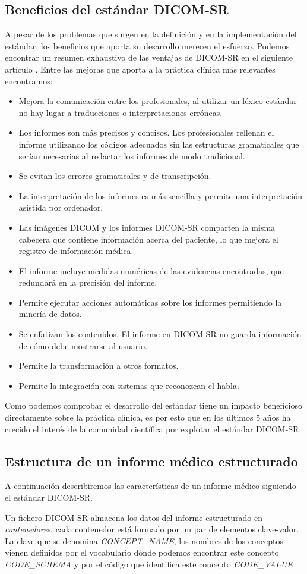 \subsection{Beneficios del estándar DICOM-SR}
A pesar de los problemas que surgen en la definición y en la implementación del estándar, los beneficios que aporta su desarrollo merecen el esfuerzo. Podemos encontrar un resumen exhaustivo de las ventajas de DICOM-SR en el siguiente artículo \cite{noumeir2006benefits}. Entre las mejoras que aporta a la práctica clínica más relevantes encontramos: 
\begin{itemize}
	\item Mejora la comunicación entre los profesionales, al utilizar un léxico estándar no hay lugar a traducciones o 	interpretaciones erróneas. 
	\item Los informes son más precisos y concisos. Los profesionales rellenan el informe utilizando los códigos adecuados sin 	las estructuras gramaticales que serían necesarias al redactar los informes de modo tradicional. 
	\item Se evitan los errores gramaticales y de transcripción.
	\item La interpretación de los informes es más sencilla y permite una interpretación asistida por ordenador. 
	\item Las imágenes DICOM y los informes DICOM-SR comparten la misma cabecera que contiene información acerca del paciente, 	lo que mejora el registro de información médica.
	\item El informe incluye medidas numéricas de las evidencias encontradas, que redundará en la precisión del informe.
	\item Permite ejecutar acciones automáticas sobre los informes permitiendo la minería de datos.
	\item Se enfatizan los contenidos. El informe en DICOM-SR no guarda información de cómo debe mostrarse al usuario.
	\item Permite la transformación a otros formatos. 
	\item Permite la integración con sistemas que reconozcan el habla. 
\end{itemize} 
Como podemos comprobar el desarrollo del estándar tiene un impacto beneficioso directamente sobre la práctica clínica, es por esto que en los últimos 5 años ha crecido el interés de la comunidad científica por explotar el estándar DICOM-SR.\par

\subsection{Estructura de un informe médico estructurado} \label{dicomsr:ficheros}
A continuación describiremos las características de un informe médico siguiendo el estándar DICOM-SR.\par
Un fichero DICOM-SR almacena los datos del informe estructurado en \textit{contenedores}, cada contenedor está formado por un par de elementos clave-valor. La clave que se denomina \textit{CONCEPT\_NAME}, los nombres de los conceptos vienen definidos por el vocabulario dónde podemos encontrar este concepto \textit{CODE\_SCHEMA} y por el código que identifica este concepto \textit{CODE\_VALUE}

